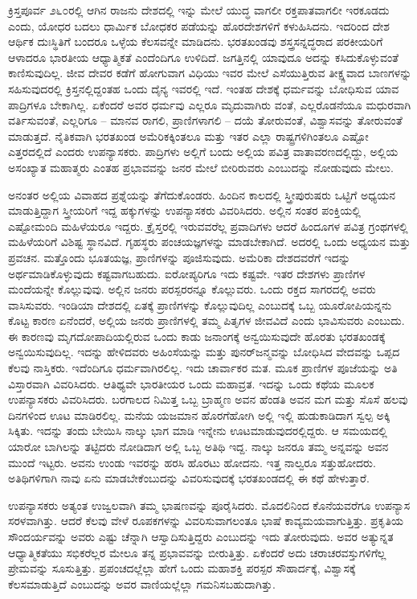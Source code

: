 ಕ್ರಿಸ್ತಪೂರ್ವ ೨೬೦ರಲ್ಲಿ ಆಗಿನ ರಾಜನು ದೇಶದಲ್ಲಿ ಇನ್ನು ಮೇಲೆ ಯುದ್ಧ ವಾಗಲೀ ರಕ್ತಪಾತವಾಗಲೀ ಇರಕೂಡದು ಎಂದು, ಯೋಧರ ಬದಲು ಧಾರ್ಮಿಕ ಬೋಧಕರ ಪಡೆಯನ್ನು ಹೊರದೇಶಗಳಿಗೆ ಕಳುಹಿಸಿದನು. ಇದರಿಂದ ದೇಶ ಆರ್ಥಿಕ ದುಃಸ್ಥಿತಿಗೆ ಬಂದರೂ ಒಳ್ಳೆಯ ಕೆಲಸವನ್ನೇ ಮಾಡಿದನು. ಭರತಖಂಡವು ಶಸ್ತ್ರಸನ್ನದ್ಧರಾದ ಪರಕೀಯರಿಗೆ ಆಳಾದರೂ ಭಾರತೀಯ ಆಧ್ಯಾತ್ಮಿಕತೆ ಎಂದೆಂದಿಗೂ ಉಳಿದಿದೆ. ಜಗತ್ತಿನಲ್ಲಿ ಯಾವುದೂ ಅದನ್ನು ಕಸಿದುಕೊಳ್ಳುವಂತೆ ಕಾಣಿಸುವುದಿಲ್ಲ. ಜೀವ ದೇವರ ಕಡೆಗೆ ಹೋಗುವಾಗ ವಿಧಿಯು ಇವರ ಮೇಲೆ ಎಸೆಯುತ್ತಿರುವ ತೀಕ್ಷ್ಣವಾದ ಬಾಣಗಳನ್ನು ಸಹಿಸುವುದರಲ್ಲಿ ಕ್ರಿಸ್ತನಲ್ಲಿದ್ದಂತಹ ಒಂದು ದೈನ್ಯ ಇವರಲ್ಲಿ ಇದೆ. ಇಂತಹ ದೇಶಕ್ಕೆ ಧರ್ಮವನ್ನು ಬೋಧಿಸುವ ಯಾವ ಪಾದ್ರಿಗಳೂ ಬೇಕಾಗಿಲ್ಲ. ಏಕೆಂದರೆ ಅವರ ಧರ್ಮವು ಎಲ್ಲರೂ ಮೃದುವಾಗಿರು ವಂತೆ, ಎಲ್ಲರೊಡನೆಯೂ ಮಧುರವಾಗಿ ವರ್ತಿಸುವಂತೆ, ಎಲ್ಲರಿಗೂ – ಮಾನವ ರಾಗಲಿ, ಪ್ರಾಣಿಗಳಾಗಲಿ – ದಯೆ ತೋರುವಂತೆ, ವಿಶ್ವಾಸವನ್ನು ತೋರುವಂತೆ ಮಾಡುತ್ತದೆ. ನೈತಿಕವಾಗಿ ಭರತಖಂಡ ಅಮೆರಿಕಕ್ಕಿಂತಲೂ ಮತ್ತು ಇತರ ಎಲ್ಲಾ ರಾಷ್ಟ್ರಗಳಿಗಿಂತಲೂ ಎಷ್ಟೋ ಎತ್ತರದಲ್ಲಿದೆ ಎಂದರು ಉಪನ್ಯಾಸಕರು. ಪಾದ್ರಿಗಳು ಅಲ್ಲಿಗೆ ಬಂದು ಅಲ್ಲಿಯ ಪವಿತ್ರ ವಾತಾವರಣದಲ್ಲಿದ್ದು, ಅಲ್ಲಿಯ ಅಸಂಖ್ಯಾತ ಮಹಾತ್ಮರು ಎಂತಹ ಪ್ರಭಾವವನ್ನು ಜನರ ಮೇಲೆ ಬೀರಿರುವರು ಎಂಬುದನ್ನು ನೋಡುವುದು ಮೇಲು.

ಅನಂತರ ಅಲ್ಲಿಯ ವಿವಾಹದ ಪ್ರಶ್ನೆಯನ್ನು ತೆಗೆದುಕೊಂಡರು. ಹಿಂದಿನ ಕಾಲದಲ್ಲಿ ಸ್ತ್ರೀಪುರುಷರು ಒಟ್ಟಿಗೆ ಅಧ್ಯಯನ ಮಾಡುತ್ತಿದ್ದಾಗ ಸ್ತ್ರೀಯರಿಗೆ ಇದ್ದ ಹಕ್ಕುಗಳನ್ನು ಉಪನ್ಯಾಸಕರು ವಿವರಿಸಿದರು. ಅಲ್ಲಿನ ಸಂತರ ಪಂಕ್ತಿಯಲ್ಲಿ ಎಷ್ಟೋಮಂದಿ ಮಹಿಳೆಯರೂ ಇದ್ದರು. ಕ್ರೈಸ್ತರಲ್ಲಿ ಇರುವವರೆಲ್ಲ ಪ್ರವಾದಿಗಳು ಆದರೆ ಹಿಂದೂಗಳ ಪವಿತ್ರ ಗ್ರಂಥಗಳಲ್ಲಿ ಮಹಿಳೆಯರಿಗೆ ವಿಶಿಷ್ಟ ಸ್ಥಾನವಿದೆ. ಗೃಹಸ್ಥರು ಪಂಚಯಜ್ಞಗಳನ್ನು ಮಾಡಬೇಕಾಗಿದೆ. ಅದರಲ್ಲಿ ಒಂದು ಅಧ್ಯಯನ ಮತ್ತು ಪ್ರವಚನ. ಮತ್ತೊಂದು ಭೂತಯಜ್ಞ, ಪ್ರಾಣಿಗಳನ್ನು ಪೂಜಿಸುವುದು. ಅಮೆರಿಕಾ ದೇಶದವರೆಗೆ ಇದನ್ನು ಅರ್ಥಮಾಡಿಕೊಳ್ಳುವುದು ಕಷ್ಟವಾಗಬಹುದು. ಐರೋಪ್ಯರಿಗೂ ಇದು ಕಷ್ಟವೇ. ಇತರ ದೇಶಗಳು ಪ್ರಾಣಿಗಳ ಮಂದೆಯನ್ನೇ ಕೊಲ್ಲುವುವು. ಅಲ್ಲಿನ ಜನರು ಪರಸ್ಪರರನ್ನೂ ಕೊಲ್ಲುವರು. ಒಂದು ರಕ್ತದ ಸಾಗರದಲ್ಲಿ ಅವರು ವಾಸಿಸುವರು. ಇಂಡಿಯಾ ದೇಶದಲ್ಲಿ ಏತಕ್ಕೆ ಪ್ರಾಣಿಗಳನ್ನು ಕೊಲ್ಲುವುದಿಲ್ಲ ಎಂಬುದಕ್ಕೆ ಒಬ್ಬ ಯೂರೋಪಿಯನ್ನನು ಕೊಟ್ಟ ಕಾರಣ ಏನೆಂದರೆ, ಅಲ್ಲಿಯ ಜನರು ಪ್ರಾಣಿಗಳಲ್ಲಿ ತಮ್ಮ ಪಿತೃಗಳ ಜೀವವಿದೆ ಎಂದು ಭಾವಿಸುವರು ಎಂಬುದು. ಈ ಕಾರಣವು ಮೃಗದೋಪಾದಿಯಲ್ಲಿರುವ ಒಂದು ಕಾಡು ಜನಾಂಗಕ್ಕೆ ಅನ್ವಯಿಸುವುದೇ ಹೊರತು ಭರತಖಂಡಕ್ಕೆ ಅನ್ವಯಿಸುವುದಿಲ್ಲ. ಇದನ್ನು ಹೇಳಿದವರು ಅಹಿಂಸೆಯನ್ನು ಮತ್ತು ಪುನರ್​ಜನ್ಮವನ್ನು ಬೋಧಿಸಿದ ವೇದವನ್ನು ಒಪ್ಪದ ಕೆಲವು ನಾಸ್ತಿಕರು. ಇದೆಂದಿಗೂ ಧರ್ಮವಾಗಿರಲಿಲ್ಲ. ಇದು ಚಾರ್ವಾಕರ ಮತ. ಮೂಕ ಪ್ರಾಣಿಗಳ ಪೂಜೆಯನ್ನು ಅತಿ ವಿಸ್ತಾರವಾಗಿ ವಿವರಿಸಿದರು. ಆತಿಥ್ಯವೇ ಭಾರತೀಯರ ಒಂದು ಮಹಾವ್ರತ. ಇದನ್ನು ಒಂದು ಕಥೆಯ ಮೂಲಕ ಉಪನ್ಯಾಸಕರು ವಿವರಿಸಿದರು. ಬರಗಾಲದ ನಿಮಿತ್ತ ಒಬ್ಬ ಬ್ರಾಹ್ಮಣ ಅವನ ಹೆಂಡತಿ ಅವನ ಮಗ ಮತ್ತು ಸೊಸೆ ಹಲವು ದಿನಗಳಿಂದ ಊಟ ಮಾಡಿರಲಿಲ್ಲ. ಮನೆಯ ಯಜಮಾನ ಹೊರಗೆಹೋಗಿ ಅಲ್ಲಿ ಇಲ್ಲಿ ಹುಡುಕಾಡಿದಾಗ ಸ್ವಲ್ಪ ಅಕ್ಕಿ ಸಿಕ್ಕಿತು. ಇದನ್ನು ತಂದು ಬೇಯಿಸಿ ನಾಲ್ಕು ಭಾಗ ಮಾಡಿ ಇನ್ನೇನು ಊಟಮಾಡುವುದರಲ್ಲಿದ್ದರು. ಆ ಸಮಯದಲ್ಲಿ ಯಾರೋ ಬಾಗಿಲನ್ನು ತಟ್ಟಿದರು ನೋಡಿದಾಗ ಅಲ್ಲಿ ಒಬ್ಬ ಅತಿಥಿ ಇದ್ದ. ನಾಲ್ಕು ಜನರೂ ತಮ್ಮ ಅನ್ನವನ್ನು ಅವನ ಮುಂದೆ ಇಟ್ಟರು. ಅವನು ಉಂಡು ಇವರನ್ನು ಹರಸಿ ಹೊರಟು ಹೋದನು. ಇತ್ತ ನಾಲ್ವರೂ ಸತ್ತುಹೋದರು. ಅತಿಥಿಗಳಿಗಾಗಿ ನಾವು ಏನು ಮಾಡಬೇಕೆಂಬುದನ್ನು ವಿವರಿಸುವುದಕ್ಕೆ ಭರತಖಂಡದಲ್ಲಿ ಈ ಕಥೆ ಹೇಳುತ್ತಾರೆ.

ಉಪನ್ಯಾಸಕರು ಅತ್ಯಂತ ಉಜ್ವಲವಾಗಿ ತಮ್ಮ ಭಾಷಣವನ್ನು ಪೂರೈಸಿದರು. ಮೊದಲಿನಿಂದ ಕೊನೆಯವರೆಗೂ ಉಪನ್ಯಾಸ ಸರಳವಾಗಿತ್ತು. ಆದರೆ ಕೆಲವು ವೇಳೆ ರೂಪಕಗಳನ್ನು ವಿವರಿಸುವಾಗಲಂತೂ ಭಾಷೆ ಕಾವ್ಯಮಯವಾಗುತ್ತಿತ್ತು. ಪ್ರಕೃತಿಯ ಸೌಂದರ್ಯವನ್ನು ಅವರು ಎಷ್ಟು ಚೆನ್ನಾಗಿ ಆಸ್ವಾದಿಸುತ್ತಿದ್ದರು ಎಂಬುದನ್ನು ಇದು ತೋರುವುದು. ಅವರ ಅತ್ಯುನ್ನತ ಆಧ್ಯಾತ್ಮಿಕತೆಯು ಸಭಿಕರೆಲ್ಲರ ಮೇಲೂ ತನ್ನ ಪ್ರಭಾವವನ್ನು ಬೀರುತ್ತಿತ್ತು. ಏಕೆಂದರೆ ಅದು ಚರಾಚರವಸ್ತುಗಳಿಗೆಲ್ಲ ಪ್ರೇಮವನ್ನು ಸೂಸುತ್ತಿತ್ತು. ಪ್ರಪಂಚದಲ್ಲೆಲ್ಲಾ ಹೇಗೆ ಒಂದು ಮಹಾಶಕ್ತಿ ಪರಸ್ಪರ ಸೌಹಾರ್ದಕ್ಕೆ, ವಿಶ್ವಾಸಕ್ಕೆ ಕೆಲಸಮಾಡುತ್ತಿದೆ ಎಂಬುದನ್ನು ಅವರ ವಾಣಿಯಲ್ಲೆಲ್ಲಾ ಗಮನಿಸಬಹುದಾಗಿತ್ತು.

